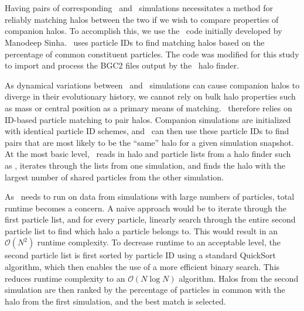 
%
%

\section{\crossmatch}
\label{sec:crossmatch}



Having pairs of corresponding \lpt\ and \za\ simulations necessitates a method for reliably matching halos between the two if we wish to compare properties of companion halos.  To accomplish this, we use the \crossmatch\ code initially developed by Manodeep Sinha.  \crossmatch\ uses particle IDs to find matching halos based on the percentage of common constituent particles.  The code was modified for this study to import and process the BGC2 files output by the \rockstar\ halo finder.

As dynamical variations between \lpt\ and \za\ simulations can cause companion halos to diverge in their evolutionary history, we cannot rely on bulk halo properties such as mass or central position as a primary means of matching.  \crossmatch\ therefore relies on ID-based particle matching to pair halos.  Companion simulations are initialized with identical particle ID schemes, and \crossmatch\ can then use these particle IDs to find pairs that are most likely to be the ``same'' halo for a given simulation snapshot.  At the most basic level, \crossmatch\ reads in halo and particle lists from a halo finder such as \rockstar, iterates through the lists from one simulation, and finds the halo with the largest number of shared particles from the other simulation.

As \crossmatch\ needs to run on data from simulations with large numbers of particles, total runtime becomes a concern.  A naive approach would be to iterate through the first particle list, and for every particle, linearly search through the entire second particle list to find which halo a particle belongs to.  This would result in an $\mathcal{O}(N^{2})$ runtime complexity.  To decrease runtime to an acceptable level, the second particle list is first sorted by particle ID using a standard QuickSort algorithm, which then enables the use of a more efficient binary search.  This reduces runtime complexity to an $\mathcal{O}(N \log N)$ algorithm.  Halos from the second simulation are then ranked by the percentage of particles in common with the halo from the first simulation, and the best match is selected.




